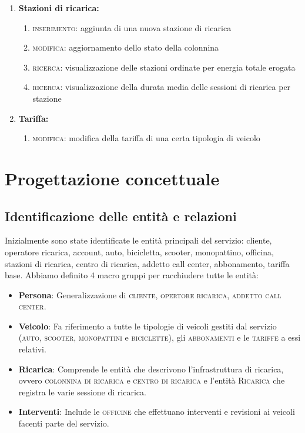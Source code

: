 \documentclass{article}
\begin{document}
\begin{enumerate}
\begin{enumerate}
    \end{enumerate}
    \item \textbf{Stazioni di ricarica:}
    \begin{enumerate}
        \item \textsc{inserimento:} aggiunta di una nuova stazione di ricarica
        \item \textsc{modifica:} aggiornamento dello stato della colonnina
        \item  \textsc{ricerca:} visualizzazione delle stazioni ordinate per energia totale erogata
        \item \textsc{ricerca:} visualizzazione della durata media delle sessioni di ricarica per stazione
    \end{enumerate}
    \item \textbf{Tariffa:}
    \begin{enumerate}
        \item \textsc{modifica}: modifica della tariffa di una certa tipologia di veicolo
    \end{enumerate}
\end{enumerate}

\newpage

\section{Progettazione concettuale}

\subsection{Identificazione delle entità e relazioni}

Inizialmente sono state identificate le entità principali del servizio: cliente, operatore ricarica, account, auto, bicicletta, scooter, monopattino, officina, stazioni di ricarica, centro di ricarica, addetto call center, abbonamento, tariffa base.
Abbiamo definito 4 macro gruppi per racchiudere tutte le entità: 
\begin{itemize}
    \item \textbf{Persona}: Generalizzazione di \textsc{cliente}, \textsc{opertore ricarica}, \textsc{addetto call center}.
    \item \textbf{Veicolo}: Fa riferimento a tutte le tipologie di veicoli gestiti dal servizio (\textsc{auto}, \textsc{scooter}, \textsc{monopattini} e \textsc{biciclette}), gli \textsc{abbonamenti} e le \textsc{tariffe} a essi relativi.
    \item \textbf{Ricarica}: Comprende le entità che descrivono l'infrastruttura di ricarica, ovvero \textsc{colonnina di ricarica} e \textsc{centro di ricarica} e l'entità \textsc{Ricarica} che registra le varie sessione di ricarica. 
    \item \textbf{Interventi}: Include le \textsc{officine} che effettuano interventi e revisioni ai veicoli facenti parte del servizio. 
\end{itemize}
\end{document}
